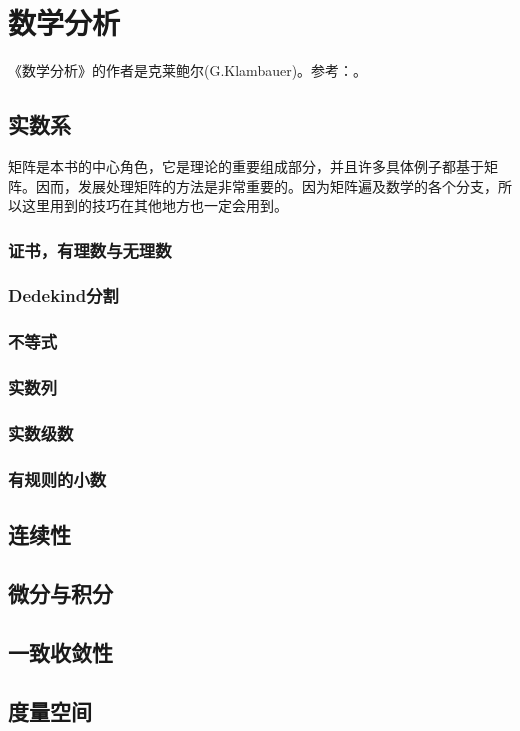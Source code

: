 \part{数学分析}
《数学分析》的作者是克莱鲍尔(G.Klambauer)。参考：\cite{MathematicalAnalysisKlambauer1981}。

\chapter{实数系}\label{ch01001}
矩阵是本书的中心角色，它是理论的重要组成部分，并且许多具体例子都基于矩阵。因而，发展处理矩阵的方法是非常重要的。因为矩阵遍及数学的各个分支，所以这里用到的技巧在其他地方也一定会用到。

\section{证书，有理数与无理数}\label{sec0100101}


\section{Dedekind分割}\label{sec0100102}


\section{不等式}\label{sec0100103}

\section{实数列}\label{sec0100104}

\section{实数级数}\label{sec0100105}

\section{有规则的小数}\label{sec0100106}


\chapter{连续性}\label{ch01002}


\chapter{微分与积分}\label{ch01003}

\chapter{一致收敛性}\label{ch01004}

\chapter{度量空间}\label{ch01005}












